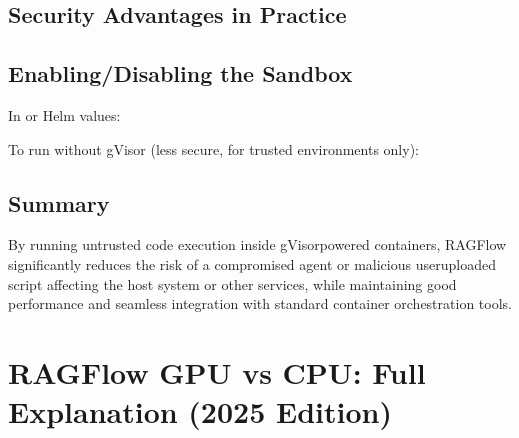\documentclass[letterpaper,10pt,english]{sphinxmanual}
\begin{document}
\section{Security Advantages in Practice}
\label{\detokenize{gvisor:security-advantages-in-practice}}

\section{Enabling/Disabling the Sandbox}
\label{\detokenize{gvisor:enabling-disabling-the-sandbox}}
\sphinxAtStartPar
In  or Helm values:

\begin{sphinxVerbatim}[commandchars=\\\{\}]
\end{sphinxVerbatim}

\sphinxAtStartPar
To run without gVisor (less secure, for trusted environments only):

\begin{sphinxVerbatim}[commandchars=\\\{\}]
\end{sphinxVerbatim}


\section{Summary}
\label{\detokenize{gvisor:summary}}
\sphinxAtStartPar
By running untrusted code execution inside gVisor\sphinxhyphen{}powered containers, RAGFlow significantly reduces the risk of a compromised agent or malicious user\sphinxhyphen{}uploaded script affecting the host system or other services, while maintaining good performance and seamless integration with standard container orchestration tools.

\sphinxstepscope


\chapter{RAGFlow GPU vs CPU: Full Explanation (2025 Edition)}
\label{\detokenize{ragflow-gpu-cpu:ragflow-gpu-vs-cpu-full-explanation-2025-edition}}\label{\detokenize{ragflow-gpu-cpu::doc}}
\end{document}
